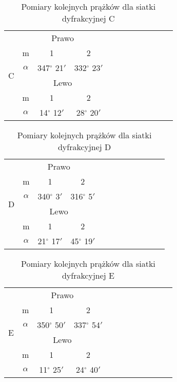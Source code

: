 \documentclass{article}
\begin{document}
\begin{table}[!ht]
    \centering
    \begin{tabular}{|c|c|c|c|c|c|c|c|c|c|c|c|}
    \hline
        \multirow{6}{*}{C}
        & \multicolumn{3}{|c|}{Prawo} \\ \cline{2-4}
        & m & 1 & 2 \\ \cline{2-4}
        & $\alpha$ & 347$^\circ$ 21$'$ & 332$^\circ$ 23$'$ \\ \cline{2-4}
        & \multicolumn{3}{|c|}{Lewo} \\ \cline{2-4}
        & m & 1 & 2 \\ \cline{2-4}
        & $\alpha$ & 14$^\circ$ 12$'$ & 28$^\circ$ 20$'$ \\ \hline
    \end{tabular}
    \caption{Pomiary kolejnych prążków dla siatki dyfrakcyjnej C}
\end{table}

\begin{table}[!ht]
    \centering
    \begin{tabular}{|c|c|c|c|c|c|c|c|c|c|c|c|}
    \hline
        \multirow{6}{*}{D}
        & \multicolumn{3}{|c|}{Prawo} \\ \cline{2-4}
        & m & 1 & 2 \\ \cline{2-4}
        & $\alpha$ & 340$^\circ$ 3$'$ & 316$^\circ$ 5$'$ \\ \cline{2-4}
        & \multicolumn{3}{|c|}{Lewo} \\ \cline{2-4}
        & m& 1 & 2 \\\cline{2-4}
        & $\alpha$  & 21$^\circ$ 17$'$ & 45$^\circ$ 19$'$ \\ \hline
    \end{tabular}
     \caption{Pomiary kolejnych prążków dla siatki dyfrakcyjnej D}
\end{table}

\begin{table}[!ht]
    \centering
    \begin{tabular}{|c|c|c|c|c|c|c|c|c|c|c|c|}
    \hline
        \multirow{6}{*}{E}
        & \multicolumn{3}{|c|}{Prawo} \\ \cline{2-4}
        & m & 1 & 2 \\ \cline{2-4}
        & $\alpha$ & 350$^\circ$ 50$'$ & 337$^\circ$ 54$'$ \\ \cline{2-4}
        & \multicolumn{3}{|c|}{Lewo} \\ \cline{2-4}
        & m & 1 & 2 \\ \cline{2-4}
        & $\alpha$ & 11$^\circ$ 25$'$ & 24$^\circ$ 40$'$ \\ \hline

    \end{tabular}
     \caption{Pomiary kolejnych prążków dla siatki dyfrakcyjnej E}
\end{table}
\end{document}
